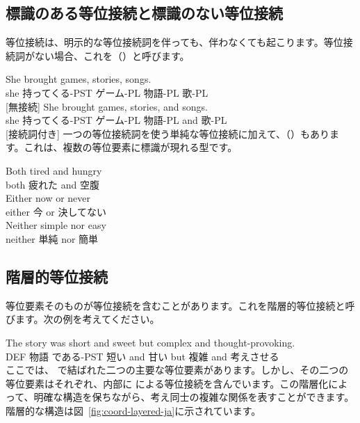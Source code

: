 \subsection{標識のある等位接続と標識のない等位接続}

等位接続は、明示的な等位接続詞を伴っても、伴わなくても起こります。等位接続詞がない場合、これを（）と呼びます。

\ea \label{ex:coord-marking-ja}
    \ea \gll She brought {\ob}games{\cb}, {\ob}stories{\cb}, {\ob}songs{\cb}.\\
        she 持ってくる-PST ゲーム-PL 物語-PL 歌-PL\\
    \glt {} [無接続]
    \ex \gll She brought {\ob}games{\cb}, {\ob}stories{\cb}, and {\ob}songs{\cb}.\\
        she 持ってくる-PST ゲーム-PL 物語-PL and 歌-PL\\
    \glt {} [接続詞付き]
    \z
\z
一つの等位接続詞を使う単純な等位接続に加えて、（）もあります。これは、複数の等位要素に標識が現れる型です。

\ea \label{ex:coord-correlative-ja}
    \ea \gll {\ob}Both{\cb} tired {\ob}and{\cb} hungry\\
        both 疲れた and 空腹\\
    \glt {}
    \ex \gll {\ob}Either{\cb} now {\ob}or{\cb} never\\
        either 今 or 決してない\\
    \glt {}
    \ex \gll {\ob}Neither{\cb} simple {\ob}nor{\cb} easy\\
        neither 単純 nor 簡単\\
    \glt {}
    \z
\z

\subsection{階層的等位接続}

等位要素そのものが等位接続を含むことがあります。これを階層的等位接続と呼びます。次の例を考えてください。

\ea \label{ex:coord-layered-ja}
\gll The story was {\ob}short and sweet{\cb} but {\ob}complex and thought-provoking{\cb}.\\
    DEF 物語 である-PST 短い and 甘い but 複雑 and 考えさせる\\
\glt {}
\z
ここでは、 で結ばれた二つの主要な等位要素があります。しかし、その二つの等位要素はそれぞれ、内部に  による等位接続を含んでいます。この階層化によって、明確な構造を保ちながら、考え同士の複雑な関係を表すことができます。階層的な構造は図~\ref{fig:coord-layered-ja}に示されています。

